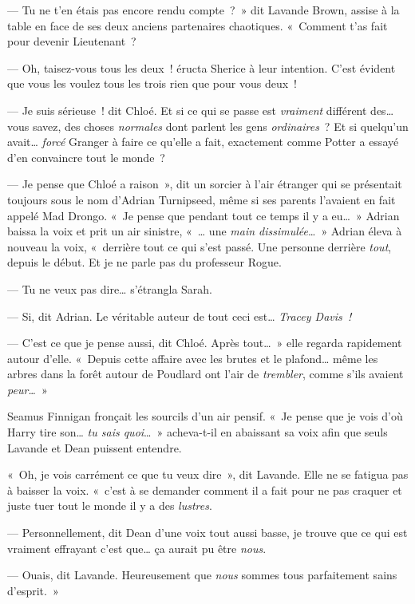 --- Tu ne t'en étais pas encore rendu compte~?~»
dit Lavande Brown, assise à la table en face de ses deux anciens partenaires chaotiques.
«~Comment t'as fait pour devenir Lieutenant~?

--- Oh, taisez-vous tous les deux~! éructa Sherice à leur intention.
C'est évident que vous les voulez tous les trois rien que pour vous deux~!

--- Je suis sérieuse~! dit Chloé.
Et si ce qui se passe est \emph{vraiment} différent des… vous savez, des choses \emph{normales} dont parlent les gens \emph{ordinaires}~?
Et si quelqu'un avait…
\emph{forcé} Granger à faire ce qu'elle a fait, exactement comme Potter a essayé d'en convaincre tout le monde~?

--- Je pense que Chloé a raison~», dit un sorcier à l'air étranger qui se présentait toujours sous le nom d'Adrian Turnipseed, même si ses parents l'avaient en fait appelé Mad Drongo.
«~Je pense que pendant tout ce temps il y a eu…~»
Adrian baissa la voix et prit un air sinistre, «~… une \emph{main dissimulée}…~»
Adrian éleva à nouveau la voix, «~derrière tout ce qui s'est passé.
Une personne derrière \emph{tout}, depuis le début.
Et je ne parle pas du professeur Rogue.

--- Tu ne veux pas dire… s'étrangla Sarah.

--- Si, dit Adrian.
Le véritable auteur de tout ceci est…
\emph{Tracey Davis~!}

--- C'est ce que je pense aussi, dit Chloé.
Après tout…~»
elle regarda rapidement autour d'elle.
«~Depuis cette affaire avec les brutes et le plafond… même les arbres dans la forêt autour de Poudlard ont l'air de \emph{trembler}, comme s'ils avaient \emph{peur…}~»

Seamus Finnigan fronçait les sourcils d'un air pensif.
«~Je pense que je vois d'où Harry tire son…
\emph{tu sais quoi}…~»
acheva-t-il en abaissant sa voix afin que seuls Lavande et Dean puissent entendre.

«~Oh, je vois carrément ce que tu veux dire~», dit Lavande.
Elle ne se fatigua pas à baisser la voix.
«~c'est à se demander comment il a fait pour ne pas craquer et juste tuer tout le monde il y a des \emph{lustres}.

--- Personnellement, dit Dean d'une voix tout aussi basse, je trouve que ce qui est vraiment effrayant c'est que… ça aurait pu être \emph{nous}.

--- Ouais, dit Lavande.
Heureusement que \emph{nous} sommes tous parfaitement sains d'esprit.~»

